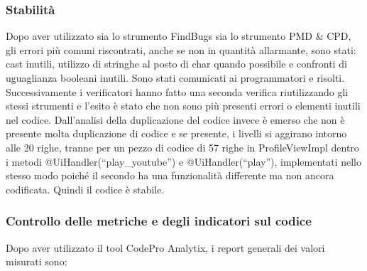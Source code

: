 \subsubsection*{Stabilit\`a}
Dopo aver utilizzato sia lo strumento FindBugs sia lo strumento PMD \& CPD, gli
errori pi\`u comuni riscontrati, anche se non in quantit\`a allarmante, sono
stati: cast inutili, utilizzo di stringhe al posto di char quando possibile
e confronti di uguaglianza booleani inutili. Sono stati
comunicati ai programmatori e risolti. Successivamente i verificatori hanno
fatto una seconda verifica riutilizzando gli stessi strumenti e l'esito \`e
stato che non sono pi\`u presenti errori o elementi inutili nel codice. 
Dall'analisi della duplicazione del
codice invece \`e emerso che non \`e presente molta duplicazione di codice e se
presente, i livelli si aggirano intorno alle 20 righe, tranne per un pezzo di
codice di 57 righe in ProfileViewImpl dentro i metodi @UiHandler(``play\_youtube'') e
@UiHandler(``play''), implementati nello stesso modo poich\'e il
secondo ha una funzionalit\`a differente ma non ancora codificata. Quindi
il codice \`e stabile.

\subsubsection*{Controllo delle metriche e degli indicatori sul codice}
Dopo aver utilizzato il tool CodePro Analytix, i report generali dei valori
misurati sono:

